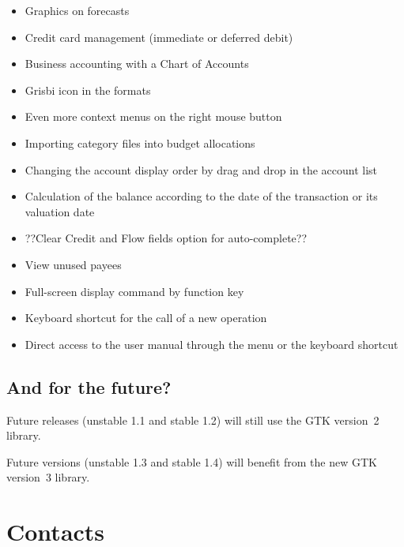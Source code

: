 \begin{itemize}

\item Graphics on forecasts

\item Credit card management (immediate or deferred debit)

\item Business accounting with a Chart of Accounts

\item Grisbi icon in the   formats 

\item Even more context menus on the right mouse button

\item Importing category files into budget allocations

\item Changing the account display order by drag and drop in the account list

\item Calculation of the balance according to the date of the transaction or its valuation date

\item ??Clear Credit and Flow fields option for auto-complete??

\item View unused payees

\item Full-screen display command by function key 

\item Keyboard shortcut   for the call of a new operation

\item Direct access to the user manual through the menu  or the keyboard shortcut  

\end{itemize}

\subsection{And for the future?}

Future releases (unstable 1.1 and stable 1.2) will still use the \gls{GTK} version~2 library.

Future versions (unstable 1.3 and stable 1.4) will benefit from the new GTK version~3 library.

\section{Contacts\label{introduction-contacts}}

